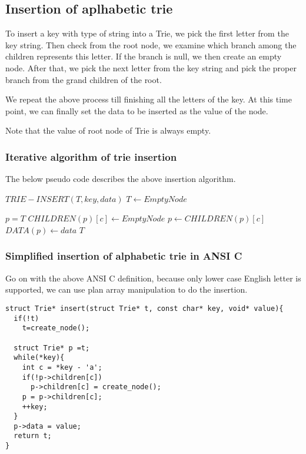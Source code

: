 \documentclass{article}
\begin{document}
\subsection{Insertion of aplhabetic trie}
To insert a key with type of string into a Trie, we pick the first letter
from the key string. Then check from the root node, we examine which branch
among the children represents this letter. If the branch is null, we then
create an empty node. After that, we pick the next letter from the key string
and pick the proper branch from the grand children of the root.

We repeat the above process till finishing all the letters of the key. 
At this time point, we can finally set the data to be inserted as the value 
of the node.

Note that the value of root node of Trie is always empty.

\subsubsection{Iterative algorithm of trie insertion}

The below pseudo code describes the above insertion algorithm.

\begin{algorithmic}
\STATE $TRIE-INSERT(T, key, data)$
   \STATE $T \leftarrow EmptyNode$ \ENDIF

  \STATE $p=T$
      \STATE $CHILDREN(p)[c] \leftarrow EmptyNode$
    \ENDIF
    \STATE $p \leftarrow CHILDREN(p)[c]$
  \ENDFOR
  \STATE $DATA(p) \leftarrow data$
  \RETURN $T$
\end{algorithmic}

\subsubsection*{Simplified insertion of alphabetic trie in ANSI C}
Go on with the above ANSI C definition, because only lower case 
English letter is supported, we can use plan array manipulation
to do the insertion.

\lstset{language=C}
\begin{lstlisting}
struct Trie* insert(struct Trie* t, const char* key, void* value){
  if(!t)
    t=create_node();

  struct Trie* p =t;
  while(*key){
    int c = *key - 'a';
    if(!p->children[c])
      p->children[c] = create_node();
    p = p->children[c];
    ++key;
  }
  p->data = value;
  return t;
}
\end{lstlisting}
\end{document}
